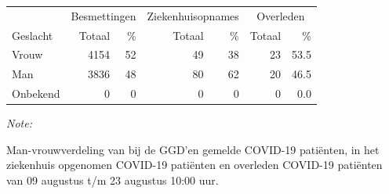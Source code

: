 \documentclass[
  english,
  man,floatsintext]{apa6}
\begin{document}
\begin{table}[H]
\centering\begingroup\fontsize{11}{13}\selectfont

\begin{threeparttable}
\begin{tabular}{lrrrrrr}
\toprule
\multicolumn{1}{c}{ } & \multicolumn{2}{c}{Besmettingen} & \multicolumn{2}{c}{Ziekenhuisopnames} & \multicolumn{2}{c}{Overleden} \\
\cmidrule(l{3pt}r{3pt}){2-3} \cmidrule(l{3pt}r{3pt}){4-5} \cmidrule(l{3pt}r{3pt}){6-7}
Geslacht & Totaal & \% & Totaal & \% & Totaal & \%\\
\midrule
Vrouw & 4154 & 52 & 49 & 38 & 23 & 53.5\\
Man & 3836 & 48 & 80 & 62 & 20 & 46.5\\
Onbekend & 0 & 0 & 0 & 0 & 0 & 0.0\\
\bottomrule
\end{tabular}
\begin{tablenotes}
\item \textit{Note: } 
\item Man-vrouwverdeling van bij de GGD’en gemelde COVID-19 patiënten, in het ziekenhuis opgenomen COVID-19 patiënten en overleden COVID-19 patiënten van 09 augustus t/m 23 augustus 10:00 uur.
\end{tablenotes}
\end{threeparttable}
\endgroup{}
\end{table}
\newpage
\end{document}
